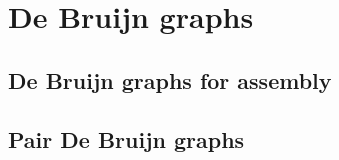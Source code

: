 \chapter{De Bruijn graphs}

\section{De Bruijn graphs for assembly}

\section{Pair De Bruijn graphs}


